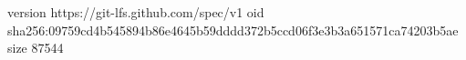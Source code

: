 version https://git-lfs.github.com/spec/v1
oid sha256:09759cd4b545894b86e4645b59dddd372b5ccd06f3e3b3a651571ca74203b5ae
size 87544
